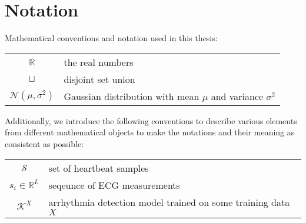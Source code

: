 
\section*{Notation}
Mathematical conventions and notation used in this thesis:

\begin{center}
    \renewcommand{\arraystretch}{1.5}
    \begin{tabular}{ c l }
        
        $\mathbb{R}$ & the real numbers \\
        $\sqcup$ & disjoint set union \\
        $\mathcal{N}(\mu, \sigma^2)$ & Gaussian distribution with mean $\mu$ and variance $\sigma^2$
    \end{tabular}
\end{center}

Additionally, we introduce the following conventions to describe various elements from different mathematical objects to make the notations and their meaning as consistent as possible:

\begin{center}
    \renewcommand{\arraystretch}{1.5}
    \begin{tabular}{c l}
        $\mathcal{S}$ & set of heartbeat samples \\
        $s_i \in \mathbb{R}^L$ & seqeunce of ECG measurements \\
        $\mathcal{K}^X$ & arrhythmia detection model trained on some training data $X$


    \end{tabular}
\end{center}
